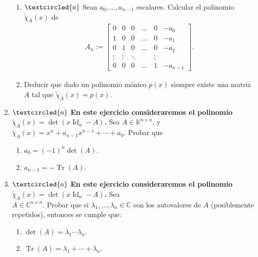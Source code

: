 \documentclass[a4paper,12pt,twoside,spanish,reqno]{amsbook}
\numberwithin{equation}{section}
\begin{document}
\begin{enumerate}[resume,topsep=6pt,itemsep=.4cm]
\begin{enumerate}
\item\label{matriz de un polinomio} $\textcircled{a}$ Sean $a_0, ..., a_{n-1}$ escalares. Calcular el polinomio $\tilde\chi_A(x)$ de
\begin{align*}
A_n := \begin{bmatrix} 0 & 0 & 0 &\dots & 0 & -a_0 \\ 1 & 0 & 0&  \dots & 0  & -a_1 \\ 0 & 1 & 0&  \dots & 0  & -a_2 \\ \vdots & \vdots & \ddots & \quad  & \vdots\\ 0 & 0 & 0 & \dots & 1  & -a_{n-1}
\end{bmatrix}.		
 \end{align*}

 \item Deducir que dado un polinomio mónico $p(x)$ siempre existe una matriz $A$ tal que $\tilde\chi_A(x)=p(x)$.


\end{enumerate}


\item\label{tr det}$\textcircled{a}$ {\bf En este ejercicio consideraremos el polinomio $\tilde\chi_A(x)=\det(x\operatorname{Id}_n-A)$.}
Sea $A\in\mathbb{K}^{n\times n}$, y \ $\tilde\chi_A(x) = x^n+a_{n-1}x^{n-1}+\cdots+a_0$. Probar que


\begin{enumerate}
	\item $a_0 = (-1)^n \det(A)$.
	\item $a_{n-1} = - \operatorname{Tr}(A)$.
\end{enumerate}


\item\label{complejos} $\textcircled{a}$ {\bf En este ejercicio consideraremos el polinomio $\tilde\chi_A(x)=\det(x\operatorname{Id}_n-A)$.} Sea \\ $A\in\mathbb{C}^{n\times n}$. Probar que si $\lambda_1,\dots,\lambda_n \in \mathbb C$ son los autovalores de $A$
(posiblemente repetidos), entonces se cumple que:


\begin{enumerate}
	\item $\det(A)=\lambda_1\cdots \lambda_n$.
	\item $\operatorname{Tr}(A)=\lambda_1+\cdots+\lambda_n$.
\end{enumerate}


\end{enumerate}
\end{document}
